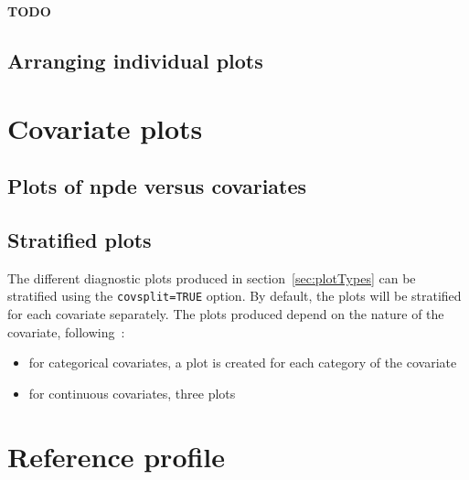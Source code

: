 \documentclass{article}
\begin{document}
{\bf TODO}

\subsection{Arranging individual plots}

\section{Covariate plots}

\subsection{Plots of {\bfseries npde} versus covariates}

\subsection{Stratified plots}

\hskip 18pt The different diagnostic plots produced in section~\ref{sec:plotTypes} can be stratified using the \verb+covsplit=TRUE+ option. By default, the plots will be stratified for each covariate separately. The plots produced depend on the nature of the covariate, following~\cite{Brendel10}:
\begin{itemize}
\item for categorical covariates, a plot is created for each category of the covariate
\item for continuous covariates, three plots 
\end{itemize}

\section{Reference profile}
\end{document}

